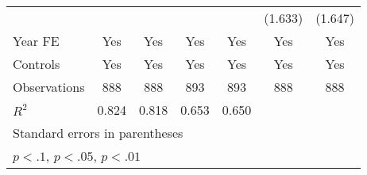 \begin{table}[htbp]
\begin{tabular}{l*{6}{c}}
                &                  &                  &                  &                  &  (1.633)         &  (1.647)         \\
\addlinespace
Year FE         &      Yes         &      Yes         &      Yes         &      Yes         &      Yes         &      Yes         \\
\addlinespace
Controls        &      Yes         &      Yes         &      Yes         &      Yes         &      Yes         &      Yes         \\
\midrule
Observations    &      888         &      888         &      893         &      893         &      888         &      888         \\
\(R^{2}\)       &    0.824         &    0.818         &    0.653         &    0.650         &                  &                  \\
\bottomrule
\multicolumn{7}{l}{\footnotesize Standard errors in parentheses}\\
\multicolumn{7}{l}{\footnotesize \sym{*} \(p<.1\), \sym{**} \(p<.05\), \sym{***} \(p<.01\)}\\
\end{tabular}
\end{table}
